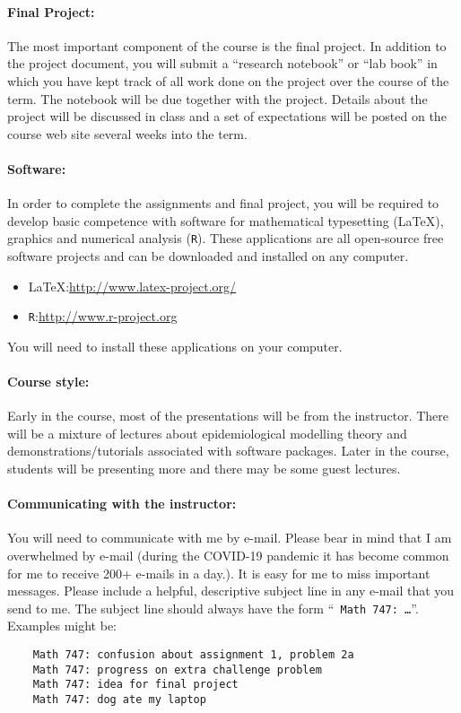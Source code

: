 \documentclass[12pt]{article}
\begin{document}
\paragraph*{Final Project:}

The most important component of the course is the final project.  In
addition to the project document, you will submit a ``research
notebook'' or ``lab book'' in which you have kept track of all work
done on the project over the course of the term.  The notebook will be
due together with the project.  Details about the project will be
discussed in class and a set of expectations will be posted on the
course web site several weeks into the term.

\paragraph*{Software:} In order to complete the assignments and final
project, you will be required to develop basic competence with
software for mathematical typesetting (\LaTeX), graphics and numerical
analysis ({\tt R}).  These applications are all open-source free
software projects and can be downloaded and installed on any computer.
\begin{itemize}\addtolength{\itemsep}{-0.5\baselineskip}
\item \LaTeX:\qquad \url{http://www.latex-project.org/}
\item {\tt R}:\qquad \url{http://www.r-project.org}
\end{itemize}
\noindent You will need to install these applications on your computer.

\paragraph*{Course style:}

Early in the course, most of the presentations will be from the
instructor.  There will be a mixture of lectures about epidemiological
modelling theory and demonstrations/tutorials associated with software
packages.  Later in the course, students will be presenting more and
there may be some guest lectures.

\paragraph*{Communicating with the instructor:}

You will need to communicate with me by e-mail.  Please bear in mind
that I am overwhelmed by e-mail (during the COVID-19 pandemic it has
become common for me to receive 200+ e-mails in a day.).  It is easy
for me to miss important messages.
Please include a helpful, descriptive subject line in any e-mail that
you send to me.  The subject line should always have the form ``{\tt
  Math 747: \dots}''.  Examples might be:
\begin{verbatim}
    Math 747: confusion about assignment 1, problem 2a
    Math 747: progress on extra challenge problem
    Math 747: idea for final project
    Math 747: dog ate my laptop
\end{verbatim}
\end{document}
